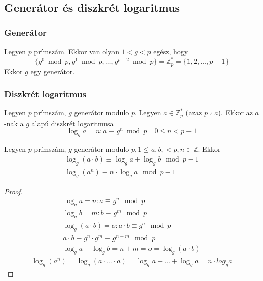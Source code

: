 \setcounter{definition}{0}
\setcounter{theorem}{0}
\subsection{Generátor és diszkrét logaritmus}
\subsubsection{Generátor}
\begin{definition}
	Legyen $p$ prímszám. Ekkor van olyan $1 < g < p$ egész, hogy
	\begin{equation*}
		\{ g^0 \bmod p, g^1 \bmod p, \dots, g^{p - 2} \bmod p\} =
		\mathbb{Z}_p^* = \{ 1, 2, \dots, p - 1 \}
	\end{equation*}
	Ekkor $g$ egy generátor.
\end{definition}
\subsubsection{Diszkrét logaritmus}
\begin{definition}
	Legyen $p$ prímszám, $g$ generátor modulo $p$.
	Legyen $a \in \mathbb{Z}_p^*$ (azaz $p \nmid a$).
	Ekkor az $a$-nak a $g$ alapú diszkrét logaritmusa
	\begin{equation*}
		\log_g a = n: a \equiv g^n \bmod p \quad 0 \leq n < p - 1
	\end{equation*}
\end{definition}
\begin{theorem}
	Legyen $p$ prímszám, $g$ generátor
	modulo $p, 1 \leq a, b, < p, n \in \mathbb{Z}$. Ekkor
	\begin{gather*}
		\log_g(a \cdot b) \equiv \log_g a + \log_g b \mod p - 1 \\
		\log_g(a^n) \equiv n \cdot \log_g a \mod p - 1
	\end{gather*}
\end{theorem}
\begin{proof}
	\begin{gather*}
		\log_g a = n: a \equiv g^n \mod p \\
		\log_g b = m: b \equiv g^m \mod p \\
		\log_g(a \cdot b) = o: a \cdot b \equiv g^o \mod p \\
		a \cdot b \equiv g^n \cdot g^m \equiv g^{n + m} \mod p \\
		\log_g a + \log_g b = n + m = o = \log_g(a \cdot b)
	\end{gather*}
	\begin{gather*}
		\log_g(a^n) = \log_g(a \cdot \dots \cdot a) =
		\log_g a + \dots + \log_g a = n \cdot log_g a
	\end{gather*}
\end{proof}
